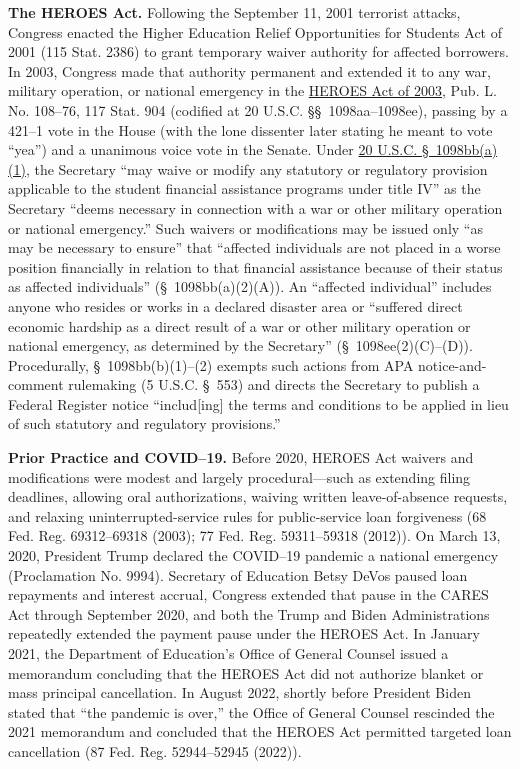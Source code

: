 \documentclass[12pt]{article}
\begin{document}
\textbf{The HEROES Act.} Following the September 11, 2001 terrorist attacks, Congress enacted the Higher Education Relief Opportunities for Students Act of 2001 (115 Stat. 2386) to grant temporary waiver authority for affected borrowers. In 2003, Congress made that authority permanent and extended it to any war, military operation, or national emergency in the \href{https://www.law.cornell.edu/uscode/text/20/chapter-28/subchapter-IV/part-G-1}{HEROES Act of 2003}, Pub. L. No. 108--76, 117 Stat. 904 (codified at 20 U.S.C. \S\S~1098aa--1098ee), passing by a 421--1 vote in the House (with the lone dissenter later stating he meant to vote ``yea'') and a unanimous voice vote in the Senate. Under \href{https://www.law.cornell.edu/uscode/text/20/1098bb}{20 U.S.C. \S~1098bb(a)(1)}, the Secretary ``may waive or modify any statutory or regulatory provision applicable to the student financial assistance programs under title IV'' as the Secretary ``deems necessary in connection with a war or other military operation or national emergency.'' Such waivers or modifications may be issued only ``as may be necessary to ensure'' that ``affected individuals are not placed in a worse position financially in relation to that financial assistance because of their status as affected individuals'' (\S~1098bb(a)(2)(A)). An ``affected individual'' includes anyone who resides or works in a declared disaster area or ``suffered direct economic hardship as a direct result of a war or other military operation or national emergency, as determined by the Secretary'' (\S~1098ee(2)(C)--(D)). Procedurally, \S~1098bb(b)(1)--(2) exempts such actions from APA notice-and-comment rulemaking (5 U.S.C. \S~553) and directs the Secretary to publish a Federal Register notice ``includ[ing] the terms and conditions to be applied in lieu of such statutory and regulatory provisions.''

\textbf{Prior Practice and COVID--19.} Before 2020, HEROES Act waivers and modifications were modest and largely procedural---such as extending filing deadlines, allowing oral authorizations, waiving written leave-of-absence requests, and relaxing uninterrupted-service rules for public-service loan forgiveness (68 Fed. Reg. 69312--69318 (2003); 77 Fed. Reg. 59311--59318 (2012)). On March 13, 2020, President Trump declared the COVID--19 pandemic a national emergency (Proclamation No. 9994). Secretary of Education Betsy DeVos paused loan repayments and interest accrual, Congress extended that pause in the CARES Act through September 2020, and both the Trump and Biden Administrations repeatedly extended the payment pause under the HEROES Act. In January 2021, the Department of Education's Office of General Counsel issued a memorandum concluding that the HEROES Act did not authorize blanket or mass principal cancellation. In August 2022, shortly before President Biden stated that ``the pandemic is over,'' the Office of General Counsel rescinded the 2021 memorandum and concluded that the HEROES Act permitted targeted loan cancellation (87 Fed. Reg. 52944--52945 (2022)).
\end{document}
